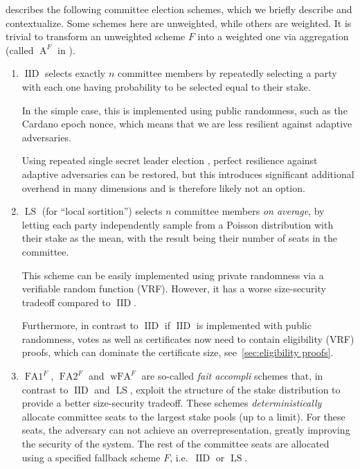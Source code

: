 \Cite{gavzi2023fait} describes the following committee election schemes, which we briefly describe and contextualize.
Some schemes here are unweighted, while others are weighted.
It is trivial to transform an unweighted scheme $F$ into a weighted one via aggregation (called $\operatorname{A}^F$ in \cite{gavzi2023fait}).
\begin{enumerate}
\item
  $\operatorname{IID}$ selects exactly $n$ committee members by repeatedly selecting a party with each one having probability to be selected equal to their stake.

  In the simple case, this is implemented using public randomness, such as the Cardano epoch nonce, which means that we are less resilient against adaptive adversaries.

  Using repeated single secret leader election \parencite{boneh2020single}, perfect resilience against adaptive adversaries can be restored, but this introduces significant additional overhead in many dimensions and is therefore likely not an option.
\item
  $\operatorname{LS}$ (for \enquote{local sortition}) selects $n$ committee members \emph{on average}, by letting each party independently sample from a Poisson distribution with their stake as the mean, with the result being their number of seats in the committee.

  This scheme can be easily implemented using private randomness via a verifiable random function (VRF).
  However, it has a worse size-security tradeoff compared to $\operatorname{IID}$.

  Furthermore, in contrast to $\operatorname{IID}$ if $\operatorname{IID}$ is implemented with public randomness, votes as well as certificates now need to contain eligibility (VRF) proofs, which can dominate the certificate size, see~\cref{sec:eligibility proofs}.
\item
  $\operatorname{FA1}^F$, $\operatorname{FA2}^F$ and $\operatorname{wFA}^F$ are so-called \emph{fait accompli} schemes that, in contrast to $\operatorname{IID}$ and $\operatorname{LS}$, exploit the structure of the stake distribution to provide a better size-security tradeoff.
  These schemes \emph{deterministically} allocate committee seats to the largest stake pools (up to a limit).
  For these seats, the adversary can not achieve an overrepresentation, greatly improving the security of the system.
  The rest of the committee seats are allocated using a specified fallback scheme $F$, i.e.\ $\operatorname{IID}$ or $\operatorname{LS}$.


\end{enumerate}
